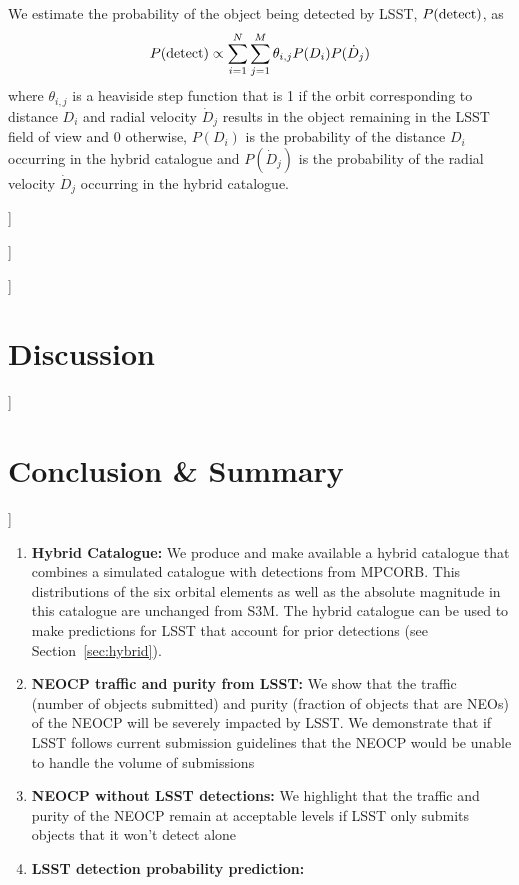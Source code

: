 \documentclass[twocolumn, twocolappendix]{aastex631}
\newcommand{\todo}[1]{{\color{red}{[TODO: #1}]}}
\newcommand{\sss}{S3M}
\newcommand{\mpco}{MPCORB}
\begin{document}
We estimate the probability of the object being detected by LSST, $P({\rm detect})$, as 
\begin{equation}
    P({\rm detect}) \propto \sum_{i = 1}^{N} \sum_{j = 1}^{M} \theta_{i, j} P(D_i) P(\dot{D}_j)
\end{equation}
where $\theta_{i, j}$ is a heaviside step function that is 1 if the orbit corresponding to distance $D_i$ and radial velocity $\dot{D}_j$ results in the object remaining in the LSST field of view and 0 otherwise, $P(D_i)$ is the probability of the distance $D_i$ occurring in the hybrid catalogue and $P(\dot{D}_j)$ is the probability of the radial velocity $\dot{D}_j$ occurring in the hybrid catalogue.

\todo{Need to explain how we know where the detector is (the scheduler thing that Mario talks about)}

\todo{Demonstrate the efficiency of this method with some plots}

\todo{Maybe also add plots of the D/dot(D) distributions of HC}

\section{Discussion} \label{sec:discussion}

\todo{Some of the results may move here, unsure what else}

\section{Conclusion \& Summary} \label{sec:conclusion}

\todo{Write and summary and spruce up the items below}

\begin{enumerate}
    \item \textbf{Hybrid Catalogue:} We produce and make available a hybrid catalogue that combines a simulated catalogue \citep{Grav+2011} with detections from \mpco{}. This distributions of the six orbital elements as well as the absolute magnitude in this catalogue are unchanged from \sss{}. The hybrid catalogue can be used to make predictions for LSST that account for prior detections (see Section~\ref{sec:hybrid}).
    \item \textbf{NEOCP traffic and purity from LSST:} We show that the traffic (number of objects submitted) and purity (fraction of objects that are NEOs) of the NEOCP will be severely impacted by LSST. We demonstrate that if LSST follows current submission guidelines that the NEOCP would be unable to handle the volume of submissions
    \item \textbf{NEOCP without LSST detections:} We highlight that the traffic and purity of the NEOCP remain at acceptable levels if LSST only submits objects that it won't detect alone
    \item \textbf{LSST detection probability prediction:}
\end{enumerate}
\end{document}

